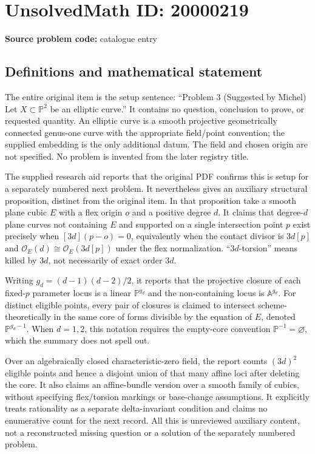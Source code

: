 \documentclass[11pt]{article}
\newcommand{\A}{\mathbb{A}}
\newcommand{\PP}{\mathbb{P}}
\begin{document}
\section*{UnsolvedMath ID: 20000219}
\textbf{Source problem code:} catalogue entry
\subsection{Definitions and mathematical statement}
The entire original item is the setup sentence: ``Problem 3 (Suggested by Michel) Let $X\subset\PP^2$ be an elliptic curve.'' It contains no question, conclusion to prove, or requested quantity. An elliptic curve is a smooth projective geometrically connected genus-one curve with the appropriate field/point convention; the supplied embedding is the only additional datum. The field and chosen origin are not specified. No problem is invented from the later registry title.

The supplied research aid reports that the original PDF confirms this is setup for a separately numbered next problem. It nevertheless gives an auxiliary structural proposition, distinct from the original item. In that proposition take a smooth plane cubic $E$ with a flex origin $o$ and a positive degree $d$. It claims that degree-$d$ plane curves not containing $E$ and supported on a single intersection point $p$ exist precisely when $[3d](p-o)=0$, equivalently when the contact divisor is $3d[p]$ and $\mathcal O_E(d)\cong\mathcal O_E(3d[p])$ under the flex normalization. ``$3d$-torsion'' means killed by $3d$, not necessarily of exact order $3d$.

Writing $g_d=(d-1)(d-2)/2$, it reports that the projective closure of each fixed-$p$ parameter locus is a linear $\PP^{g_d}$ and the non-containing locus is $\A^{g_d}$. For distinct eligible points, every pair of closures is claimed to intersect scheme-theoretically in the same core of forms divisible by the equation of $E$, denoted $\PP^{g_d-1}$. When $d=1,2$, this notation requires the empty-core convention $\PP^{-1}=\varnothing$, which the summary does not spell out.

Over an algebraically closed characteristic-zero field, the report counts $(3d)^2$ eligible points and hence a disjoint union of that many affine loci after deleting the core. It also claims an affine-bundle version over a smooth family of cubics, without specifying flex/torsion markings or base-change assumptions. It explicitly treats rationality as a separate delta-invariant condition and claims no enumerative count for the next record. All this is unreviewed auxiliary content, not a reconstructed missing question or a solution of the separately numbered problem.
\end{document}
